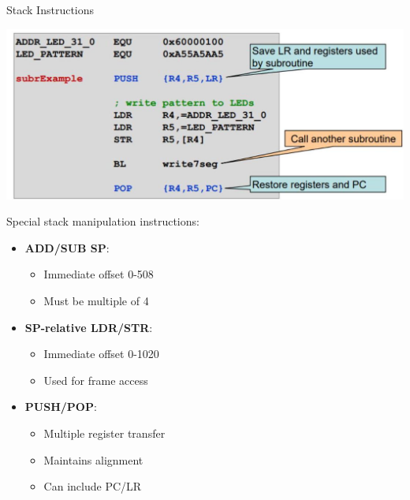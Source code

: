 \begin{concept}{Stack Instructions}

\includegraphics[width=\linewidth]{images/2024_12_29_79e6b22f503fb7b4f718g-08}


Special stack manipulation instructions:
\vspace{1mm}\\
\begin{minipage}[t]{0.5\linewidth}
\begin{itemize}
  \item \textbf{ADD/SUB SP}:
    \begin{itemize}
      \item Immediate offset 0-508
      \item Must be multiple of 4
    \end{itemize}
  \item \textbf{SP-relative LDR/STR}:
    \begin{itemize}
      \item Immediate offset 0-1020
      \item Used for frame access
    \end{itemize}
\end{itemize}
\end{minipage}
\begin{minipage}[t]{0.5\linewidth}
\begin{itemize}
  \item \textbf{PUSH/POP}:
    \begin{itemize}
      \item Multiple register transfer
      \item Maintains alignment
      \item Can include PC/LR
    \end{itemize}
\end{itemize}
\end{minipage}
\end{concept}

